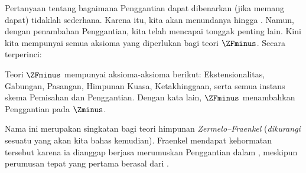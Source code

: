 \documentclass[../../../include/open-logic-section]{subfiles}
\begin{document}

Pertanyaan tentang bagaimana Penggantian dapat dibenarkan (jika memang
dapat) tidaklah sederhana. Karena itu, kita akan menundanya hingga
. Namun, dengan penambahan Penggantian, kita telah
mencapai tonggak penting lain. Kini kita mempunyai semua aksioma yang
diperlukan bagi teori $\ZFminus$. Secara terperinci:

\begin{defn}
Teori $\ZFminus$ mempunyai aksioma-aksioma berikut: Ekstensionalitas,
Gabungan, Pasangan, Himpunan Kuasa, Ketakhinggaan, serta semua instans
skema Pemisahan dan Penggantian. Dengan kata lain, $\ZFminus$ menambahkan
Penggantian pada $\Zminus$.
\end{defn}
\noindent
Nama ini merupakan singkatan bagi teori himpunan
\emph{Zermelo--Fraenkel} (\emph{dikurangi} sesuatu yang akan kita bahas
kemudian). Fraenkel mendapat kehormatan tersebut karena ia dianggap berjasa
merumuskan Penggantian dalam \citeyear{Fraenkel1922}, meskipun perumusan
tepat yang pertama berasal dari \citet{Skolem1922}.
\end{document}
